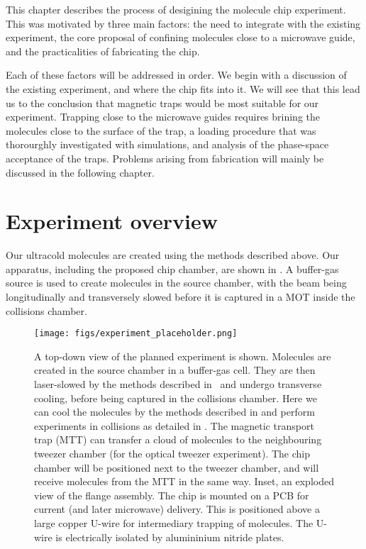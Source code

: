 This chapter describes the process of desigining the molecule chip experiment.
This was motivated by three main factors: the need to integrate with the
existing experiment, the core proposal of confining molecules close to a
microwave guide, and the practicalities of fabricating the chip.

Each of these factors will be addressed in order. We begin with a discussion of
the existing experiment, and where the chip fits into it. We will see that this
lead us to the conclusion that magnetic traps would be most suitable for our
experiment. Trapping close to the microwave guides requires brining the
molecules close to the surface of the trap, a loading procedure that was
thorourghly investigated with simulations, and analysis of the phase-space
acceptance of the traps. Problems arising from fabrication will mainly be
discussed in the following chapter.

\section{Experiment overview}

Our ultracold molecules are created using the methods described above. Our
apparatus, including the proposed chip chamber, are shown in
. A buffer-gas source is used to create
\CaF{} molecules in the source chamber, with the beam being longitudinally and
transversely slowed before it is captured in a MOT inside the collisions
chamber.

\begin{figure}[htb]
  \centering
  \texttt{[image: figs/experiment\_placeholder.png]}
  \caption{
    A top-down view of the planned \CaF{} experiment is shown. Molecules are
    created in the source chamber in a buffer-gas cell. They are then
    laser-slowed by the methods described in~\cite{} and undergo transverse
    cooling, before being captured in the collisions chamber.
    Here we can cool the
    molecules by the methods described in  and perform
    experiments in collisions as detailed in . The magnetic transport
    trap (MTT) can transfer a cloud of molecules to the neighbouring tweezer
    chamber (for the optical tweezer experiment). The chip chamber will be
    positioned next to the tweezer chamber, and will receive molecules from the
    MTT in the same way. Inset, an exploded view of the flange assembly. The
    chip is mounted on a PCB for current (and later microwave) delivery. This
    is positioned above a large copper U-wire for intermediary trapping of
    molecules. The U-wire is electrically isolated by alumininium nitride
    plates.}
  \label{design:fig:vacuumsystem}
\end{figure}

